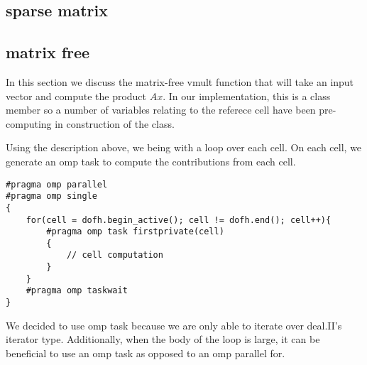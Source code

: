 \documentclass[12pt]{article}
\begin{document}
\subsection{sparse matrix}

\subsection{matrix free}
In this section we discuss the matrix-free vmult function that will take an input vector and compute the product $Ax$. In our implementation, this is a class member so a number of variables relating to the referece cell have been pre-computing in construction of the class.

Using the description above, we being with a loop over each cell. On each cell, we generate an omp task to compute the contributions from each cell.
\begin{lstlisting}
#pragma omp parallel
#pragma omp single
{
  	for(cell = dofh.begin_active(); cell != dofh.end(); cell++){
		#pragma omp task firstprivate(cell)
		{
			// cell computation
		}
	}
	#pragma omp taskwait
}            
\end{lstlisting}

We decided to use omp task because we are only able to iterate over deal.II's iterator type. Additionally, when the body of the loop is large, it can be beneficial to use an omp task as opposed to an omp parallel for. 
\end{document}
